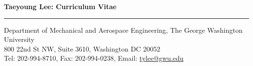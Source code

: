 \documentclass[10pt]{article}
\newif\ifdatabase
\begin{document}
\allowdisplaybreaks

\nocite{*}    
\ifdatabase
\DTLsettabseparator
\DTLsavedb{mybib}{tylee_db.txt}
\DTLsort{Year=descending,Month=descending}{mybib}
\fi

\begin{center}
{\Large\bf Taeyoung Lee: Curriculum Vitae}\\\vspace*{-0.2cm}\rule{\linewidth}{0.2mm}
Department of Mechanical and Aerospace Engineering, The George Washington University\\
800 22nd St NW, Suite 3610, Washington DC 20052\\
Tel: 202-994-8710, \quad Fax: 202-994-0238, \quad Email: \url{tylee@gwu.edu}
\end{center}

\vspace*{0.4cm}

\setlength{\tabcolsep}{0cm}
\end{document}
